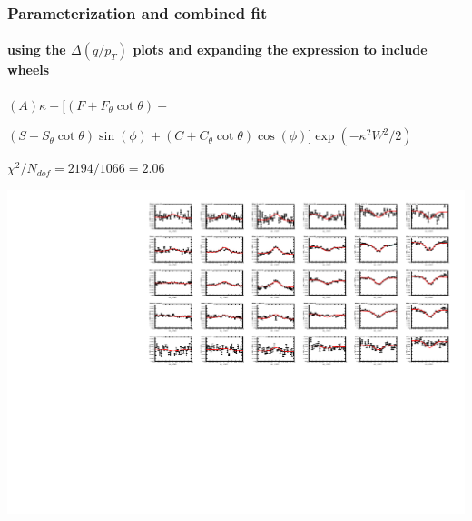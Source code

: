 \documentclass[compress]{beamer}
\begin{document}
\begin{frame}
\frametitle{{\large Parameterization and combined fit}}
\framesubtitle{using the $\Delta(q/p_T)$ plots and expanding the expression to include wheels}

$(A)\kappa + \big[(F + F_{\theta}\cot\theta) + $

\hfill $(S + S_{\theta}\cot\theta)\sin(\phi) + (C + C_{\theta}\cot\theta)\cos(\phi)\big]\exp(-\kappa^2 W^2 / 2)$

\begin{center}
$\chi^2/N_{dof} = 2194/1066 = 2.06$
\end{center}
\includegraphics[width=0.9\linewidth]{allfits.pdf}
\end{frame}
\end{document}
